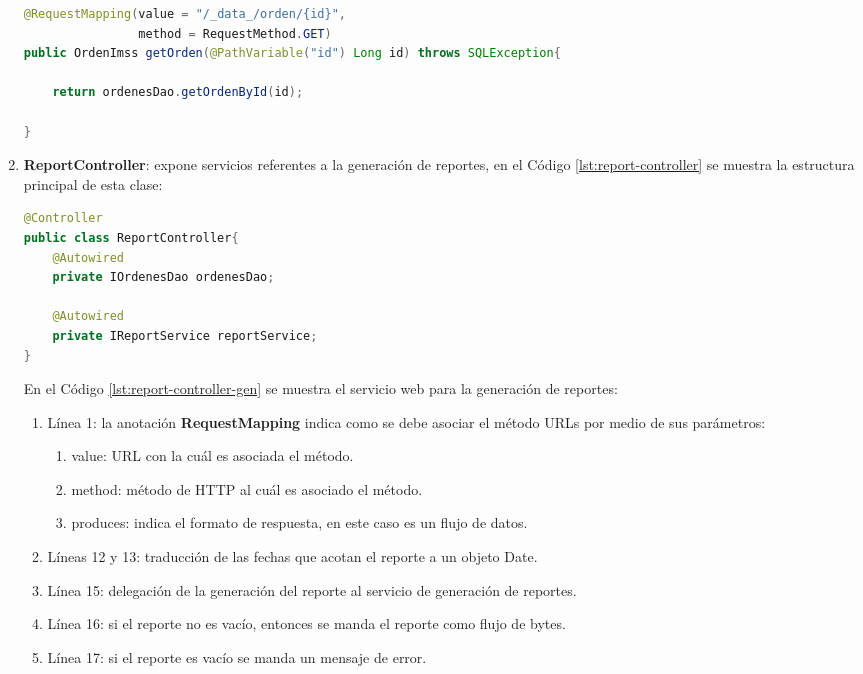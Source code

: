 \begin{enumerate}
\begin{lstlisting}[language=Java, caption={Servicio Web para obtener una orden de reposición.}, captionpos=b, label={lst:data-controller}]
@RequestMapping(value = "/_data_/orden/{id}",
				method = RequestMethod.GET)
public OrdenImss getOrden(@PathVariable("id") Long id) throws SQLException{

	return ordenesDao.getOrdenById(id);

}
\end{lstlisting}

	\item \textbf{ReportController}: expone servicios referentes a la generación de reportes, en el Código \ref{lst:report-controller} se muestra la estructura principal de esta clase:
\begin{lstlisting}[language=Java, caption={Controlador para exponer servicios Web de generación de reportes.}, captionpos=b, label={lst:report-controller}]
@Controller
public class ReportController{
	@Autowired
	private IOrdenesDao ordenesDao;
	
	@Autowired
	private IReportService reportService;
}
\end{lstlisting}

	En el Código \ref{lst:report-controller-gen} se muestra el servicio web para la generación de reportes:
	\begin{enumerate}
		\item Línea 1: la anotación \textbf{RequestMapping} indica como se debe asociar el método URLs por medio de sus parámetros:
		\begin{enumerate}
			\item value: URL con la cuál es asociada el método.
			\item method: método de HTTP al cuál es asociado el método.
			\item produces: indica el formato de respuesta, en este caso es un flujo de datos.
		\end{enumerate}
		\item Líneas 12 y 13: traducción de las fechas que acotan el reporte a un objeto Date.
		\item Línea 15: delegación de la generación del reporte al servicio de generación de reportes.
		\item Línea 16: si el reporte no es vacío, entonces se manda el reporte como flujo de bytes.
		\item Línea 17: si el reporte es vacío se manda un mensaje de error.
	\end{enumerate}


\end{enumerate}

